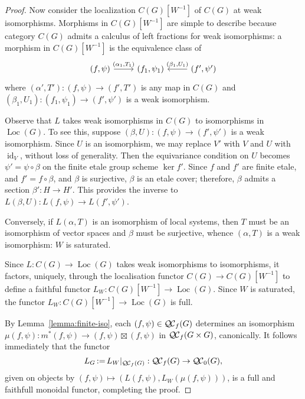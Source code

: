 \documentclass[11pt]{amsart}
\theoremstyle{plain}
\theoremstyle{definition}
\theoremstyle{remark}
\DeclareMathOperator{\id}{id}
\newcommand{\ceq}{{\, :=\, }}
\newcommand{\QC}{{\mathcal{Q\hskip-0.8pt C}}}
\newcommand{\QCb}{{\QC_0}}
\newcommand{\QCf}{{\QC_f}}
\newcommand{\Loc}{{\operatorname{Loc}}}
\begin{document}
\begin{proof}
 Now consider the localization $C(G)[W^{-1}]$ of $C(G)$ at weak isomorphisms.
 Morphisms in $C(G)[W^{-1}]$ are simple to describe because category $C(G)$ 
 admits a calculus of left fractions
 for weak isomorphisms:
 a morphism in $C(G)[W^{-1}]$ is the equivalence class of 
  \begin{equation}\label{eq:morGCf}
   \begin{tikzcd}
   (f,\psi) \arrow{r}{(\alpha_1,T_1)} & (f_1,\psi_1) & \arrow[swap]{l}{(\beta_1,U_1)} (f',\psi')
   \end{tikzcd}
  \end{equation}
 where $(\alpha',T') : (f,\psi) \to (f',T')$ is any map in $C(G)$ 
 and $(\beta_1,U_1) : (f_1,\psi_1) \to (f',\psi')$ is a weak isomorphism.

 Observe that $L$ takes weak isomorphisms in $C(G)$ to isomorphisms in $\Loc(G)$. 
 To see this, suppose $(\beta,U) : (f,\psi)\to (f',\psi')$ is a weak isomorphism. 
 Since $U$ is an isomorphism, we may replace $V'$ with $V$ and $U$ with $\id_V$, without loss of generality. 
 Then the equivariance condition on $U$ becomes $\psi' = \psi\circ \beta$ on the finite etale group scheme $\ker f'$. 
 Since $f$ and $f'$ are finite etale, and $f' = f\circ \beta$, and $\beta$ is surjective, $\beta$ is an etale cover; therefore, $\beta$ admits a section $\beta' : H \to H'$. This provides the inverse to $L(\beta,U) : L(f,\psi) \to L(f',\psi')$.
 
 Conversely, if $L(\alpha,T)$ is an isomorphism of local systems, 
 then $T$ must be an isomorphism of vector spaces and $\beta$ must be surjective, whence $(\alpha,T)$ is a weak isomorphism: $W$ is saturated.
  
 Since $L : C(G) \to \Loc(G)$ takes weak isomorphisms to isomorphisms,
 it factors, uniquely, through the localisation functor $C(G) \to C(G)[W^{-1}]$ 
 to define a faithful functor $L_{W} : C(G)[W^{-1}] \to \Loc(G)$. 
 Since $W$ is saturated, the functor $L_{W} : C(G)[W^{-1}] \to \Loc(G)$ is full. 
   
 By Lemma~\ref{lemma:finite-iso}, each $(f,\psi) \in \QCf(G)$ determines 
 an isomorphism $\mu(f,\psi) : m^*(f,\psi) \to (f,\psi) \boxtimes (f,\psi)$ in $\QCf(G\times G)$, canonically.
 It follows immediately that the functor 
 \[
 L_G  \ceq  L_{W}\vert_{\QCf(G)} : \QCf(G) \to \QCb(G),
 \] 
 given on objects by $(f,\psi) \mapsto (L(f,\psi), L_{W}(\mu(f,\psi)))$,
 is a full and faithfull monoidal functor, completing the proof.
\end{proof}
\end{document}
